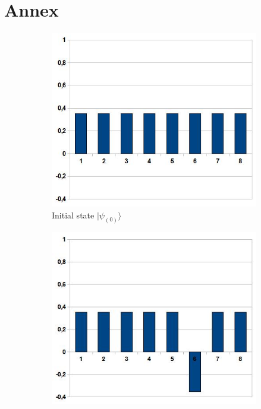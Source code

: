 \clearpage
\section{Annex}
\begin{figure}[ht!]
    \centering
        \begin{subfigure}[b]{0.40\textwidth}
            \includegraphics[width=\textwidth]{Grover-EtatInitial.jpg}
            \caption{\footnotesize Initial state $|\psi_{(0)}\rangle$}
            \label{fig2:first}
        \end{subfigure}
        \hspace{1cm}
        \begin{subfigure}[b]{0.40\textwidth}
            \includegraphics[width=\textwidth]{Grover-PassageParBoiteNoire.jpg}

\end{subfigure}
\end{figure}
